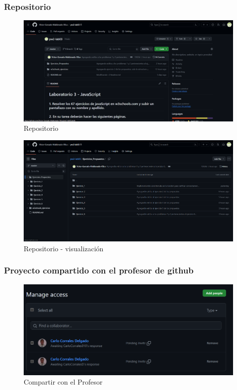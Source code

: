\documentclass{article}
\begin{document}
	\subsubsection{Repositorio}
	\begin{figure}[H]
		\centering
		\includegraphics[width=1\textwidth,keepaspectratio]{img/Repositorio.png}
		\caption{Repositorio}
	\end{figure}
	\begin{figure}[H]
		\centering
		\includegraphics[width=1\textwidth,keepaspectratio]{img/Rep2.png}
		\caption{Repositorio - visualización}
	\end{figure}
	\subsubsection{Proyecto compartido con el profesor de github}
	\begin{figure}[H]
		\centering
		\includegraphics[width=1\textwidth,keepaspectratio]{img/Compartir.png}
		\caption{Compartir con el Profesor}
	\end{figure}
	\newpage
\end{document}
